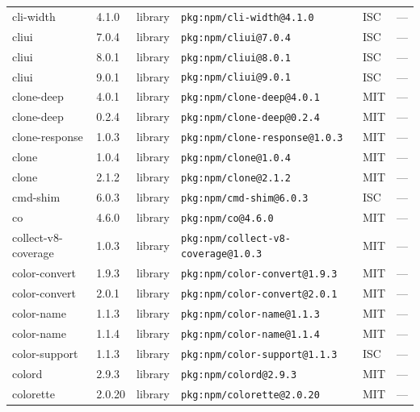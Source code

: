 \documentclass[11pt,a4paper]{article}
\begin{document}
\begin{longtable}{|p{4cm}|p{2cm}|p{1.6cm}|p{5cm}|p{1.5cm}|p{3.5cm}|}
\raggedright cli-width & 4.1.0 & library & \small\texttt{pkg:npm/cli-width@4.1.0} & ISC & \small — \\
\raggedright cliui & 7.0.4 & library & \small\texttt{pkg:npm/cliui@7.0.4} & ISC & \small — \\
\raggedright cliui & 8.0.1 & library & \small\texttt{pkg:npm/cliui@8.0.1} & ISC & \small — \\
\raggedright cliui & 9.0.1 & library & \small\texttt{pkg:npm/cliui@9.0.1} & ISC & \small — \\
\raggedright clone-deep & 4.0.1 & library & \small\texttt{pkg:npm/clone-deep@4.0.1} & MIT & \small — \\
\raggedright clone-deep & 0.2.4 & library & \small\texttt{pkg:npm/clone-deep@0.2.4} & MIT & \small — \\
\raggedright clone-response & 1.0.3 & library & \small\texttt{pkg:npm/clone-response@1.0.3} & MIT & \small — \\
\raggedright clone & 1.0.4 & library & \small\texttt{pkg:npm/clone@1.0.4} & MIT & \small — \\
\raggedright clone & 2.1.2 & library & \small\texttt{pkg:npm/clone@2.1.2} & MIT & \small — \\
\raggedright cmd-shim & 6.0.3 & library & \small\texttt{pkg:npm/cmd-shim@6.0.3} & ISC & \small — \\
\raggedright co & 4.6.0 & library & \small\texttt{pkg:npm/co@4.6.0} & MIT & \small — \\
\raggedright collect-v8-coverage & 1.0.3 & library & \small\texttt{pkg:npm/collect-v8-coverage@1.0.3} & MIT & \small — \\
\raggedright color-convert & 1.9.3 & library & \small\texttt{pkg:npm/color-convert@1.9.3} & MIT & \small — \\
\raggedright color-convert & 2.0.1 & library & \small\texttt{pkg:npm/color-convert@2.0.1} & MIT & \small — \\
\raggedright color-name & 1.1.3 & library & \small\texttt{pkg:npm/color-name@1.1.3} & MIT & \small — \\
\raggedright color-name & 1.1.4 & library & \small\texttt{pkg:npm/color-name@1.1.4} & MIT & \small — \\
\raggedright color-support & 1.1.3 & library & \small\texttt{pkg:npm/color-support@1.1.3} & ISC & \small — \\
\raggedright colord & 2.9.3 & library & \small\texttt{pkg:npm/colord@2.9.3} & MIT & \small — \\
\raggedright colorette & 2.0.20 & library & \small\texttt{pkg:npm/colorette@2.0.20} & MIT & \small — \\

\end{longtable}
\end{document}
